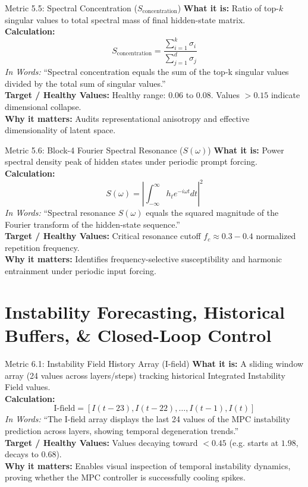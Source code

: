 \documentclass[11pt,a4paper]{article}
\begin{document}
\begin{metricbox}{Metric 5.5: Spectral Concentration ($S_{\text{concentration}}$)}
\textbf{What it is:} Ratio of top-$k$ singular values to total spectral mass of final hidden-state matrix.\\
\textbf{Calculation:}
 $$S_{\text{concentration}} = \frac{\sum_{i=1}^k \sigma_i}{\sum_{j=1}^d \sigma_j}$$ \emph{In Words:} ``Spectral concentration equals the sum of the top-k singular values divided by the total sum of singular values.''\\
\textbf{Target / Healthy Values:} Healthy range: $0.06$ to $0.08$. Values $> 0.15$ indicate dimensional collapse.\\
\textbf{Why it matters:} Audits representational anisotropy and effective dimensionality of latent space.
\end{metricbox}

\begin{metricbox}{Metric 5.6: Block-4 Fourier Spectral Resonance ($S(\omega)$)}
\textbf{What it is:} Power spectral density peak of hidden states under periodic prompt forcing.\\
\textbf{Calculation:}
 $$S(\omega) = \left|\int_{-\infty}^\infty h_t e^{-i\omega t} dt\right|^2$$ \emph{In Words:} ``Spectral resonance $S(\omega)$ equals the squared magnitude of the Fourier transform of the hidden-state sequence.''\\
\textbf{Target / Healthy Values:} Critical resonance cutoff $f_c \approx 0.3 - 0.4$ normalized repetition frequency.\\
\textbf{Why it matters:} Identifies frequency-selective susceptibility and harmonic entrainment under periodic input forcing.
\end{metricbox}

\section{Instability Forecasting, Historical Buffers, \& Closed-Loop Control}

\begin{metricbox}{Metric 6.1: Instability Field History Array (I-field)}
\textbf{What it is:} A sliding window array (24 values across layers/steps) tracking historical Integrated Instability Field values.\\
\textbf{Calculation:}
 $$\text{I-field} = \left[I(t-23), I(t-22), \dots, I(t-1), I(t)\right]$$ \emph{In Words:} ``The I-field array displays the last 24 values of the MPC instability prediction across layers, showing temporal degeneration trends.''\\
\textbf{Target / Healthy Values:} Values decaying toward $< 0.45$ (e.g. starts at $1.98$, decays to $0.68$).\\
\textbf{Why it matters:} Enables visual inspection of temporal instability dynamics, proving whether the MPC controller is successfully cooling spikes.
\end{metricbox}
\end{document}
